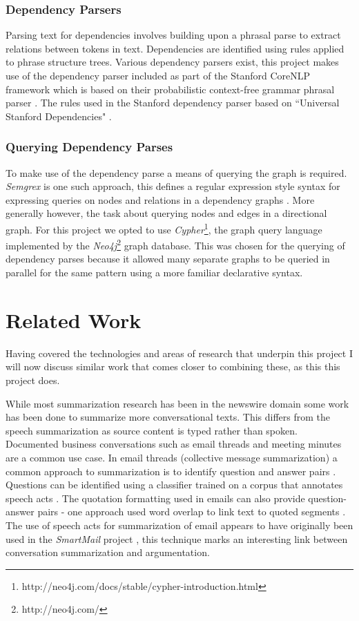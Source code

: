       \subsubsection{Dependency Parsers}
        Parsing text for dependencies involves building upon a phrasal parse to extract relations between tokens in text. Dependencies are identified using rules applied to phrase structure trees. Various dependency parsers exist, this project makes use of the dependency parser included as part of the Stanford CoreNLP framework \cite{de2006generating} which is based on their probabilistic context-free grammar phrasal parser \cite{klein2003accurate}. The rules used in the Stanford dependency parser based on ``Universal Stanford Dependencies" \cite{de2014universal}.
      \subsubsection{Querying Dependency Parses}
        To make use of the dependency parse a means of querying the graph is required. \textit{Semgrex} is one such approach, this defines a regular expression style syntax for expressing queries on nodes and relations in a dependency graphs \cite{Chambers2007}. More generally however, the task about querying nodes and edges in a directional graph. For this project we opted to use \textit{Cypher}\footnote{http://neo4j.com/docs/stable/cypher-introduction.html}, the graph query language implemented by the \textit{Neo4j}\footnote{http://neo4j.com/} graph database. This was chosen for the querying of dependency parses because it allowed many separate graphs to be queried in parallel for the same pattern using a more familiar declarative syntax.

  \section{Related Work}
    Having covered the technologies and areas of research that underpin this project I will now discuss similar work that comes closer to combining these, as this this project does.

    While most summarization research has been in the newswire domain some work has been done to summarize more conversational texts. This differs from the speech summarization as source content is typed rather than spoken. Documented business conversations such as email threads and meeting minutes are a common use case. In email threads (collective message summarization) a common approach to summarization is to identify question and answer pairs \cite{shrestha2007using,shrestha2004detection,carenini2007summarizing}. Questions can be identified using a classifier trained on a corpus that annotates speech acts \cite{shrestha2004detection}. The quotation formatting used in emails can also provide question-answer pairs - one approach used word overlap to link text to quoted segments \cite{carenini2007summarizing}. The use of speech acts for summarization of email appears to have originally been used in the \textit{SmartMail} project \cite{corston2004task}, this technique marks an interesting link between conversation summarization and argumentation.

